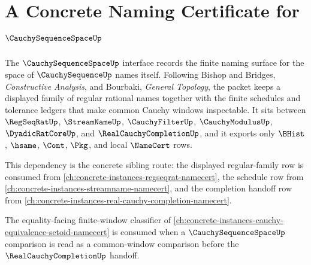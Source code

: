\chapter{A Concrete Naming Certificate for $\CauchySequenceSpaceUp$}
\label{ch:concrete-instances-cauchysequencespace-namecert}

The $\CauchySequenceSpaceUp$ interface records the finite naming surface for the space of $\CauchySequenceUp$ names itself. Following Bishop and Bridges, \emph{Constructive Analysis}, and Bourbaki, \emph{General Topology}, the packet keeps a displayed family of regular rational names together with the finite schedules and tolerance ledgers that make common Cauchy windows inspectable. It sits between $\RegSeqRatUp$, $\StreamNameUp$, $\CauchyFilterUp$, $\CauchyModulusUp$, $\DyadicRatCoreUp$, and $\RealCauchyCompletionUp$, and it exports only $\BHist$, $\hsame$, $\Cont$, $\Pkg$, and local $\NameCert$ rows.

This dependency is the concrete sibling route: the displayed regular-family row is consumed from \autoref{ch:concrete-instances-regseqrat-namecert}, the schedule row from \autoref{ch:concrete-instances-streamname-namecert}, and the completion handoff row from \autoref{ch:concrete-instances-real-cauchy-completion-namecert}.

The equality-facing finite-window classifier of \autoref{ch:concrete-instances-cauchy-equivalence-setoid-namecert} is consumed when a $\CauchySequenceSpaceUp$ comparison is read as a common-window comparison before the $\RealCauchyCompletionUp$ handoff.

